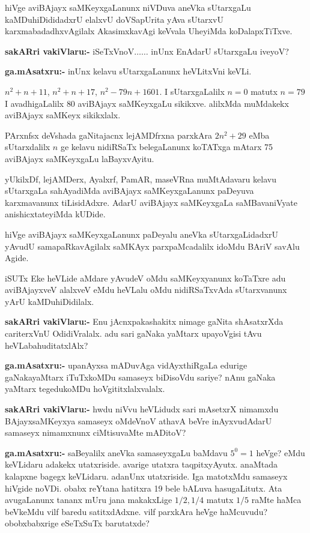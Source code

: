hiVge aviBAjayx saMKeyxgaLanunx niVDuva aneVka sUtarxgaLu kaMDuhiDididadxrU elalxvU doVSapUrita yAva sUtarxvU karxmabadadhxvAgilalx AkasimxkavAgi keVvala UheyiMda koDalapxTiTxve.

\smallskip
\noindent
\textbf{sakARri vakiVlaru:-} iSeTxVnoV$\ldots\ldots$ inUnx EnAdarU sUtarxgaLu iveyoV?

\smallskip
\noindent
\textbf{ga.mAsatxru:-} inUnx kelavu sUtarxgaLanunx heVLitxVni keVLi.

$n^2+n+11$, $n^2+n+17$, $n^2-79n+1601$. I sUtarxgaLalilx $n=0$ matutx $n=79$ I avadhigaLalilx {\rm 80} aviBAjayx saMKeyxgaLu sikikxve. alilxMda muMdakekx aviBAjayx saMKeyx sikikxlalx.

PArxnfsx deVshada gaNitajacnx lejAMDfrxna parxkAra $2n^2+29$ eMba sUtarxdalilx $n$ ge kelavu nidiRSaTx belegaLanunx koTATxga mAtarx {\rm 75} aviBAjayx saMKeyxgaLu laBayxvAyitu.

yUkilxDf, lejAMDerx, Ayalxrf, PamAR, maseVRna muMtAdavaru kelavu sUtarxgaLa sahAyadiMda aviBAjayx saMKeyxgaLanunx paDeyuva karxmavanunx tiLisidAdxre. AdarU aviBAjayx saMKeyxgaLa saMBavaniVyate anishicxtateyiMda kUDide.

hiVge aviBAjayx saMKeyxgaLanunx paDeyalu aneVka sUtarxgaLidadxrU yAvudU samapaRkavAgilalx saMKAyx parxpaMcadalilx idoMdu BAriV savAlu Agide. 

iSUTx Eke heVLide aMdare yAvudeV oMdu saMKeyxyanunx koTaTxre adu aviBAjayxveV alalxveV eMdu heVLalu oMdu nidiRSaTxvAda sUtarxvanunx yArU kaMDuhiDidilalx.

\smallskip
\noindent
\textbf{sakARri vakiVlaru:-} Enu jAcnxpakashakitx nimage gaNita shAsatxrXda cariterxVnU OdidiVralalx. adu sari gaNaka yaMtarx upayoVgisi tAvu heVLabahuditatxlAlx?

\smallskip
\noindent
\textbf{ga.mAsatxru:-} upanAyxsa mADuvAga vidAyxthiRgaLa edurige gaNakayaMtarx iTuTxkoMDu samaseyx biDisoVdu sariye? nAnu gaNaka yaMtarx tegedukoMDu hoVgititxlalxvalalx.

\smallskip
\noindent
\textbf{sakARri vakiVlaru:-} hwdu niVvu heVLidudx sari mAsetxrX nimamxdu BAjayxsaMKeyxya samaseyx oMdeVnoV athavA beVre inAyxvudAdarU samaseyx nimamxnunx ciMtisuvaMte mADitoV?

\smallskip
\noindent
\textbf{ga.mAsatxru:-} saBeyalilx aneVka samaseyxgaLu baMdavu $5^0=1$ heVge? eMdu keVLidaru adakekx utatxriside. avarige utatxra taqpitxyAyutx. anaMtada kalapxne bagegx keVLidaru. adanUnx utatxriside. Iga matotxMdu samaseyx hiVgide noVDi. obabx reYtana hatitxra {\rm 19} bele bALuva hasugaLitutx. Ata avugaLanunx tananx mUru jana makakxLige $1/2, 1/4$ matutx $1/5$ raMte haMca beVkeMdu vilf baredu satitxdAdxne. vilf parxkAra heVge haMcuvudu? obobxbabxrige eSeTxSuTx barutatxde?

